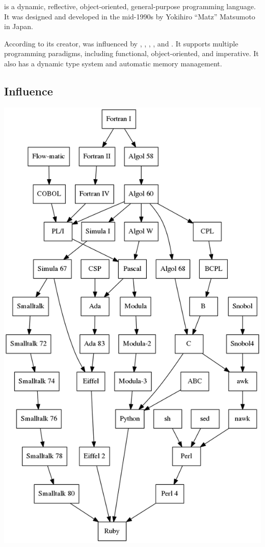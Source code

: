 \documentclass[../Languages.tex]{subfiles}
\begin{document}
\label{sec:ruby}

 is a dynamic, reflective, object-oriented, general-purpose
programming language. It was designed and developed in the mid-1990s by
Yokihiro ``Matz'' Matsumoto in Japan.

According to its creator,  was influenced by ,
, , , and . It supports multiple
programming paradigms, including functional, object-oriented, and imperative.
It also has a dynamic type system and automatic memory management.

\subsection{Influence}\label{sub:influence}

\begin{Figure}
  \centering
  \includegraphics[height=0.5\textheight]{ruby}
\end{Figure}

\newpage
\end{document}
